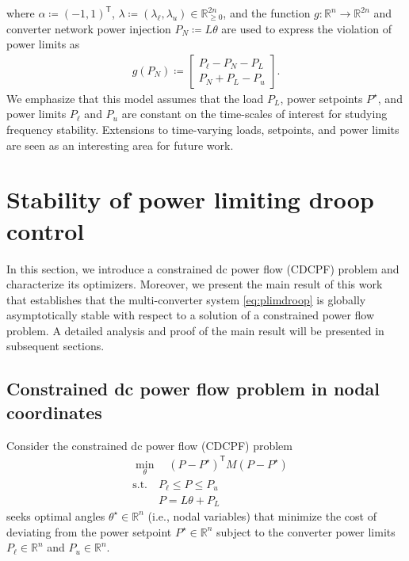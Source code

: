 \documentclass[twocolumn,twoside,journal]{IEEEtran}
\begin{document}
where $\alpha \coloneqq (-1, 1)^\mathsf{T}$, $\lambda \coloneqq  (\lambda_\ell,\lambda_u) \in \mathbb{R}^{2n}_{\geq 0}$, and the function $g: \mathbb{R}^n \to \mathbb{R}^{2n}$ and converter network power injection $P_N \coloneqq L \theta$ are used to express the violation of power limits as
\begin{align*}
    g(P_N) \coloneqq \begin{bmatrix}
    P_{\ell} - P_N - P_L\\
    P_N + P_{L}-P_u
    \end{bmatrix}.
\end{align*}
%
We emphasize that this model assumes that the load $P_L$, power setpoints $P^\star$, and power limits $P_\ell$ and $P_u$ are constant on the time-scales of interest for studying frequency stability. Extensions to time-varying loads, setpoints, and power limits are seen as an interesting area for future work. 


\section{Stability of power limiting droop control}
In this section, we introduce a constrained dc power flow (CDCPF) problem and characterize its optimizers. Moreover, we present the main result of this work that establishes that the multi-converter system \eqref{eq:plimdroop} is globally asymptotically stable with respect to a solution of a constrained power flow problem. A detailed analysis and proof of the main result will be presented in subsequent sections.

\subsection{Constrained dc power flow problem in nodal coordinates}
Consider the constrained dc power flow (CDCPF) problem 
\begin{subequations}\label{eq:pfprob}
    \begin{align}
        &\min_{\theta} \quad (P-P^\star)^\mathsf{T} M (P-P^\star) \\
        & \text {s.t.} \quad  P_\ell \leq P \leq P_{u} \label{eq:pfprob:dcpf:lim}\\
        & \phantom{\text{s.t.}} \quad P = L \theta + P_L \label{eq:pfprob:dcpf}
        \end{align}
\end{subequations}
seeks optimal angles $\theta^\star \in \mathbb{R}^n$ (i.e., nodal variables) that minimize the cost of deviating from the power setpoint $P^\star \in \mathbb{R}^n$ subject to the converter power limits $P_\ell \in \mathbb{R}^n$ and $P_u\in \mathbb{R}^n$.
\end{document}
